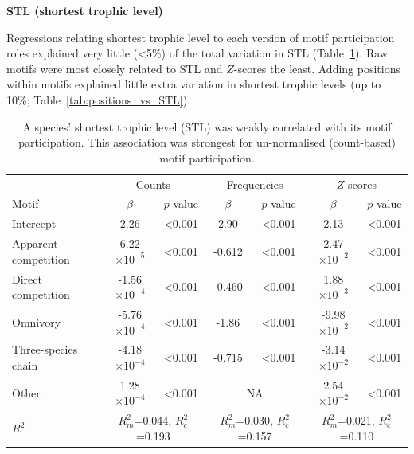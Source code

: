 \documentclass[12pt]{article}
\begin{document}
\begin{spacing}{2.0}
		\textbf{STL (shortest trophic level)}

			Regressions relating shortest trophic level to each version of motif participation roles explained very little (\textless5\%) of the total variation in STL (Table~\ref{tab:motifs_vs_STL}). 
			Raw motifs were most closely related to STL and $Z$-scores the least.
            Adding positions within motifs explained little extra variation in shortest trophic levels (up to 10\%; Table~\ref{tab:positions_vs_STL}).

			\begin{table}[hb!]
    			\caption{A species' shortest trophic level (STL) was weakly correlated with its motif participation. This association was strongest for un-normalised (count-based) motif participation.}
    			\label{tab:motifs_vs_STL}
    			\begin{tabular}{l | c c | c c | c c}
    			& \multicolumn{2}{c|}{Counts} & \multicolumn{2}{c|}{Frequencies} & \multicolumn{2}{c}{$Z$-scores} \\
    			Motif & $\beta$ & $p$-value & $\beta$ & $p$-value & $\beta$ & $p$-value \\
    			\hline
    			Intercept & 2.26 & \textless0.001 & 2.90 & \textless0.001 & 2.13 & \textless0.001 \\
    			\hline
    			Apparent competition & 6.22$\times10^{-5}$ & \textless0.001 & -0.612 & \textless0.001 & 2.47$\times10^{-2}$ & \textless0.001 \\
    			Direct competition   & -1.56$\times10^{-4}$ & \textless0.001 & -0.460 & \textless0.001 & 1.88$\times10^{-3}$ & \textless0.001 \\
    			Omnivory       & -5.76$\times10^{-4}$ & \textless0.001 & -1.86 & \textless0.001 & -9.98$\times10^{-2}$ & \textless0.001 \\
    			Three-species chain  & -4.18$\times10^{-4}$ & \textless0.001 & -0.715 & \textless0.001 & -3.14$\times10^{-2}$ & \textless0.001 \\
    			Other    & 1.28$\times10^{-4}$ & \textless0.001 & \multicolumn{2}{c|}{NA} & 2.54$\times10^{-2}$ & \textless0.001 \\
    			\hline
    			$R^2$ & \multicolumn{2}{c|}{\tiny{$R^2_m$=0.044, $R^2_c$=0.193}} & 
    			\multicolumn{2}{c|}{\tiny{$R^2_m$=0.030, $R^2_c$=0.157}} & 
    			\multicolumn{2}{c}{\tiny{$R^2_m$=0.021, $R^2_c$=0.110}} \\
    			\end{tabular}
    			\end{table}



\end{spacing}
\end{document}
